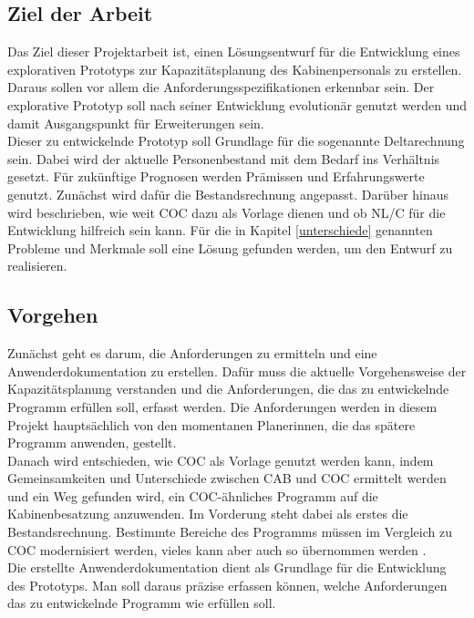 \documentclass [12pt, a4paper, oneside, titlepage, ngerman]{article}
\begin{document}
\subsection {Ziel der Arbeit} 
Das Ziel dieser Projektarbeit ist, einen Lösungsentwurf für die Entwicklung eines explorativen Prototyps zur Kapazitätsplanung des Kabinenpersonals zu erstellen. Daraus sollen vor allem die Anforderungsspezifikationen erkennbar sein. Der explorative Prototyp soll nach seiner Entwicklung evolutionär genutzt werden und damit Ausgangspunkt für Erweiterungen sein. \\
Dieser zu entwickelnde Prototyp soll Grundlage für die sogenannte Deltarechnung sein. Dabei wird der aktuelle Personenbestand mit dem Bedarf ins Verhältnis gesetzt. Für zukünftige Prognosen werden Prämissen und Erfahrungswerte genutzt. Zunächst wird dafür die Bestandsrechnung angepasst. Darüber hinaus wird beschrieben, wie weit \ac{COC} dazu als Vorlage dienen und ob \ac{NL/C} für die Entwicklung hilfreich sein kann. Für die in Kapitel \ref{unterschiede} genannten Probleme und Merkmale soll eine Lösung gefunden werden, um den Entwurf zu realisieren.

\subsection {Vorgehen}
Zunächst geht es darum, die Anforderungen zu ermitteln und eine Anwenderdokumentation zu erstellen. Dafür muss die aktuelle Vorgehensweise der Kapazitätsplanung verstanden und die Anforderungen, die das zu entwickelnde Programm erfüllen soll, erfasst werden. Die Anforderungen werden in diesem Projekt hauptsächlich von den momentanen Planerinnen, die das spätere Programm anwenden, gestellt. \\
Danach wird entschieden, wie \ac{COC} als Vorlage genutzt werden kann, indem Gemeinsamkeiten und Unterschiede zwischen \ac{CAB} und \ac{COC} ermittelt werden und ein Weg gefunden wird, ein \ac{COC}-ähnliches Programm auf die Kabinenbesatzung anzuwenden. Im Vorderung steht dabei als erstes die Bestandsrechnung. Bestimmte Bereiche des Programms müssen im Vergleich zu \ac{COC} modernisiert werden, vieles kann aber auch so übernommen werden \cite[vgl.][]{Gespraech1}. \\ %
Die erstellte Anwenderdokumentation dient als Grundlage für die Entwicklung des Prototyps. Man soll daraus präzise erfassen können, welche Anforderungen das zu entwickelnde Programm wie erfüllen soll.
\end{document}
